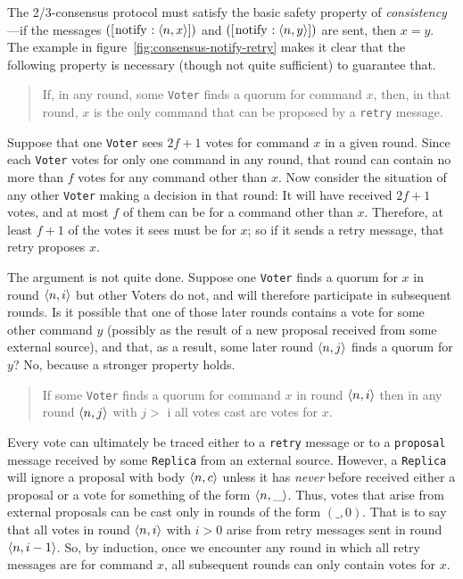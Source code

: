 \documentclass[final]{article}
\newcommand{\listinline}[1]{\text{\lstinline{#1}}}
\newcommand{\MSG}[2]{[\listinline{#1}:#2]}
\begin{document}
The 2/3-consensus protocol must satisfy the basic safety property of
\emph{consistency}---if the messages $(\MSG{notify}{\NUPRLpair{n}{x}})$ and
$(\MSG{notify}{\NUPRLpair{n}{y}})$ are sent, then $x=y$.  The example in
figure~\ref{fig:consensus-notify-retry} makes it clear that the
following property is necessary (though not quite sufficient) to
guarantee that.

\begin{quote}
If, in any round, some \lstinline{Voter} finds a quorum for command
$x$, then, in that round, $x$ is the only command that can be proposed
by a \lstinline{retry} message.
\end{quote}

 Suppose that one \lstinline{Voter} sees $2f+1$
votes for command $x$ in a given round.  Since each \lstinline{Voter}
votes for only one command in any round, that round can contain no
more than $f$ votes for any command other than $x$.  Now consider the
situation of any other \lstinline{Voter} making a decision in that
round: It will have received $2f+1$ votes, and at most $f$ of them can
be for a command other than $x$.  Therefore, at least $f+1$ of the
votes it sees must be for $x$; so if it sends a retry message, that
retry proposes $x$.

\vspace{1.0ex}

The argument is not quite done.  Suppose one \lstinline{Voter} finds a
quorum for $x$ in round $\langle n,i\rangle$ but other Voters do not,
and will therefore participate in subsequent rounds.  Is it possible
that one of those later rounds contains a vote for some other command
$y$ (possibly as the result of a new proposal received from some
external source), and that, as a result, some later round
$\langle n,j\rangle$ finds a quorum for $y$?  No, because a stronger
property holds.

\begin{quote}
If some \lstinline{Voter} finds a quorum for command $x$ in round
$\langle n,i\rangle $ then in any round $\langle n,j\rangle$ with $j >$ i
all votes cast are votes for $x$.
\end{quote}

 Every vote can ultimately be traced either to a
\lstinline{retry} message or to a \lstinline{proposal} message
received by some \lstinline{Replica} from an external source.
However, a \lstinline{Replica} will ignore a proposal with body
$\langle n,c\rangle$ unless it has \emph{never} before received either a
proposal or a vote for something of the form $\langle n,\_\rangle$.
Thus, votes that arise from external proposals can be cast only in
rounds of the form $(\_,0)$.  That is to say that all votes in round
$\langle n,i\rangle$ with $i > 0$ arise from retry messages sent in
round $\langle n,i-1\rangle$.  So, by induction, once we encounter any
round in which all retry messages are for command $x$, all subsequent
rounds can only contain votes for $x$.
\end{document}
